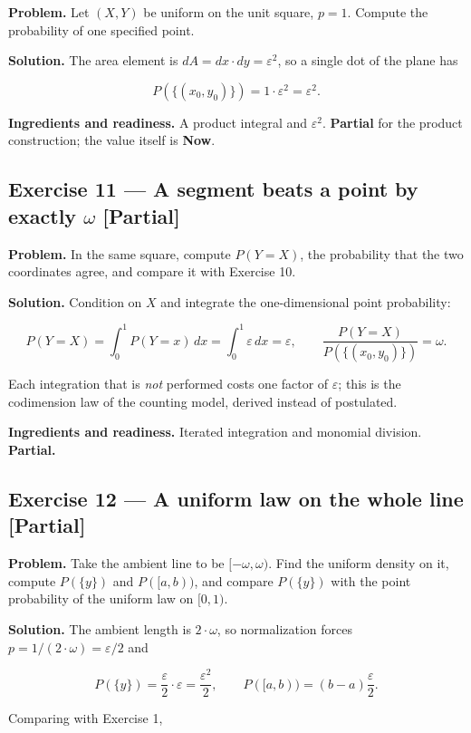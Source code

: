 \documentclass[11pt]{article}
\newcommand{\eps}{\varepsilon}
\renewcommand{\epsilon}{\varepsilon}
\begin{document}
\textbf{Problem.} Let $(X,Y)$ be uniform on the unit square, $p = 1$. Compute the
probability of one specified point.

\textbf{Solution.} The area element is $dA = dx\cdot dy = \eps^2$, so a single dot of
the plane has

\[
P(\{(x_0,y_0)\})=1\cdot\epsilon^{2}=\epsilon^{2}.
\]

\textbf{Ingredients and readiness.} A product integral and $\eps^2$. \textbf{Partial}
for the product construction; the value itself is \textbf{Now}.


\subsection*{Exercise 11 --- A segment beats a point by exactly $\omega$ \hfill \normalfont\small[Partial]}

\textbf{Problem.} In the same square, compute $P(Y = X)$, the probability that the
two coordinates agree, and compare it with Exercise 10.

\textbf{Solution.} Condition on $X$ and integrate the one-dimensional point
probability:

\[
P(Y=X)=\int_0^1 P(Y=x)\,dx=\int_0^1 \epsilon\,dx=\epsilon,
\qquad
\frac{P(Y=X)}{P(\{(x_0,y_0)\})}=\omega .
\]

Each integration that is \emph{not} performed costs one factor of $\eps$; this
is the codimension law of the counting model, derived instead of postulated.

\textbf{Ingredients and readiness.} Iterated integration and monomial division.
\textbf{Partial.}


\subsection*{Exercise 12 --- A uniform law on the whole line \hfill \normalfont\small[Partial]}

\textbf{Problem.} Take the ambient line to be $[-\omega, \omega)$. Find the uniform
density on it, compute $P(\{y\})$ and $P([a,b))$, and compare $P(\{y\})$ with the
point probability of the uniform law on $[0,1)$.

\textbf{Solution.} The ambient length is $2\cdot \omega$, so normalization forces
$p = 1/(2\cdot \omega) = \eps/2$ and

\[
P(\{y\})=\frac\epsilon2\cdot\epsilon=\frac{\epsilon^{2}}2,
\qquad
P([a,b))=(b-a)\frac\epsilon2 .
\]

Comparing with Exercise 1,
\end{document}
